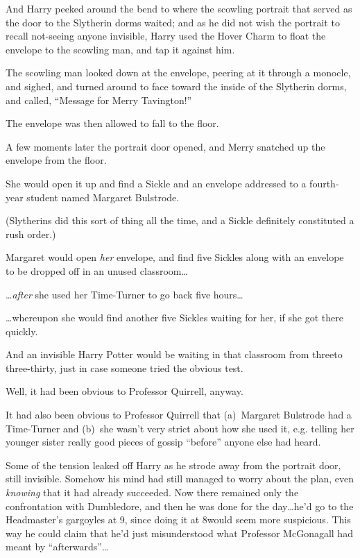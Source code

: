 And Harry peeked around the bend to where the scowling portrait that served as the door to the Slytherin dorms waited; and as he did not wish the portrait to recall not-seeing anyone invisible, Harry used the Hover Charm to float the envelope to the scowling man, and tap it against him.

The scowling man looked down at the envelope, peering at it through a monocle, and sighed, and turned around to face toward the inside of the Slytherin dorms, and called, “Message for Merry Tavington!”

The envelope was then allowed to fall to the floor.

A few moments later the portrait door opened, and Merry snatched up the envelope from the floor.

She would open it up and find a Sickle and an envelope addressed to a fourth-year student named Margaret Bulstrode.

(Slytherins did this sort of thing all the time, and a Sickle definitely constituted a rush order.)

Margaret would open \emph{her} envelope, and find five Sickles along with an envelope to be dropped off in an unused classroom…

…\emph{after} she used her Time-Turner to go back five hours…

…whereupon she would find another five Sickles waiting for her, if she got there quickly.

And an invisible Harry Potter would be waiting in that classroom from three\pm to three-thirty, just in case someone tried the obvious test.

Well, it had been obvious to Professor Quirrell, anyway.

It had also been obvious to Professor Quirrell that (a)~Margaret Bulstrode had a Time-Turner and (b)~she wasn’t very strict about how she used it, e.g. telling her younger sister really good pieces of gossip “before” anyone else had heard.

Some of the tension leaked off Harry as he strode away from the portrait door, still invisible. Somehow his mind had still managed to worry about the plan, even \emph{knowing} that it had already succeeded. Now there remained only the confrontation with Dumbledore, and then he was done for the day…he’d go to the Headmaster’s gargoyles at 9\pm, since doing it at 8\pm would seem more suspicious. This way he could claim that he’d just misunderstood what Professor McGonagall had meant by “afterwards”…

